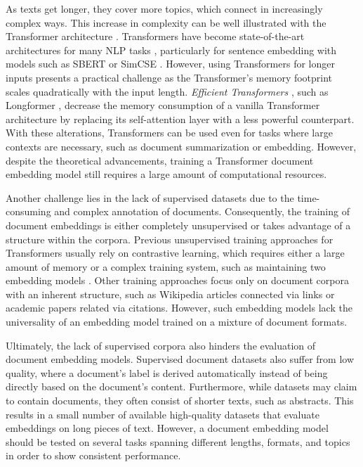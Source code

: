 As texts get longer, they cover more topics, which connect in increasingly
complex ways. This increase in complexity can be well illustrated with the
Transformer architecture \citep{vaswani2017attention}. Transformers have become
state-of-the-art architectures for many NLP tasks
\citep{devlin2019bert,liu2019roberta}, particularly for sentence embedding with
models such as SBERT \citep{reimers2019sentence} or SimCSE
\citep{gao2021simcse}. However, using Transformers for longer inputs presents a
practical challenge as the Transformer's memory footprint scales quadratically
with the input length. \emph{Efficient Transformers} \citep{tay2022efficient},
such as Longformer \citep{beltagy2020longformer}, decrease the memory
consumption of a vanilla Transformer architecture by replacing its
self-attention layer with a less powerful counterpart. With these alterations,
Transformers can be used even for tasks where large contexts are necessary,
such as document summarization or embedding. However, despite the theoretical
advancements, training a Transformer document embedding model still requires a
large amount of computational resources.

Another challenge lies in the lack of supervised datasets due to the
time-consuming and complex annotation of documents. Consequently, the training
of document embeddings is either completely unsupervised or takes advantage of
a structure within the corpora. Previous unsupervised training approaches for
Transformers usually rely on contrastive learning, which requires either a
large amount of memory \citep{neelakantan2022text} or a complex training
system, such as maintaining two embedding models
\citep{izacard2021unsupervised}. Other training approaches
\citep{ostendorff2022neighborhood,cohan2020specter} focus only on document
corpora with an inherent structure, such as Wikipedia articles connected via
links or academic papers related via citations. However, such embedding models
lack the universality of an embedding model trained on a mixture of document
formats.

Ultimately, the lack of supervised corpora also hinders the evaluation of
document embedding models. Supervised document datasets also suffer from low
quality, where a document's label is derived automatically instead of being
directly based on the document's content. Furthermore, while datasets may claim
to contain documents, they often consist of shorter texts, such as abstracts.
This results in a small number of available high-quality datasets that evaluate
embeddings on long pieces of text. However, a document embedding model should
be tested on several tasks spanning different lengths, formats, and topics in
order to show consistent performance.

